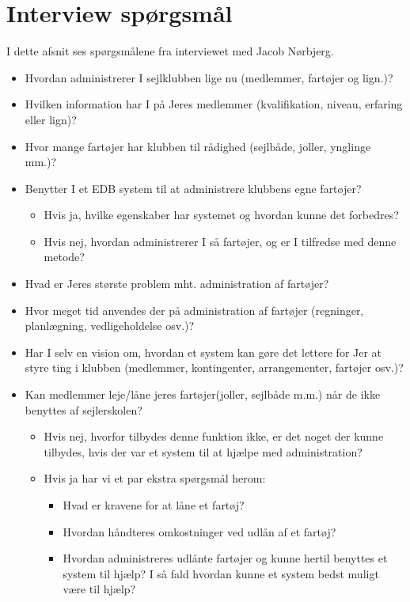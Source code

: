 \chapter{Interview spørgsmål} \label{questions}
I dette afsnit ses spørgsmålene fra interviewet med Jacob Nørbjerg.

\begin{itemize}
\item Hvordan administrerer I sejlklubben lige nu (medlemmer, fartøjer og lign.)?
\item Hvilken information har I på Jeres medlemmer (kvalifikation, niveau, erfaring eller lign)?
\item Hvor mange fartøjer har klubben til rådighed (sejlbåde, joller, ynglinge mm.)?
\item Benytter I et EDB system til at administrere klubbens egne fartøjer?
	\begin{itemize}
	\item Hvis ja, hvilke egenskaber har systemet og hvordan kunne det forbedres?
	\item Hvis nej, hvordan administrerer I så fartøjer, og er I tilfredse med denne metode?
	\end{itemize}
\item Hvad er Jeres største problem mht. administration af fartøjer?
\item Hvor meget tid anvendes der på administration af fartøjer (regninger, planlægning, vedligeholdelse osv.)?
\item Har I selv en vision om, hvordan et system kan gøre det lettere for Jer at styre ting i klubben (medlemmer, kontingenter, arrangementer, fartøjer osv.)?
\item Kan medlemmer leje/låne jeres fartøjer(joller, sejlbåde m.m.) når de ikke benyttes af sejlerskolen?
	\begin{itemize}
	\item Hvis nej, hvorfor tilbydes denne funktion ikke, er det noget der kunne tilbydes, hvis der var et system til at hjælpe med administration?
	\item Hvis ja har vi et par ekstra spørgsmål herom:
		\begin{itemize}
		\item Hvad er kravene for at låne et fartøj?
		\item Hvordan håndteres omkostninger ved udlån af et fartøj?
		\item Hvordan administreres udlånte fartøjer og kunne hertil benyttes et system til hjælp? I så fald hvordan kunne et system bedst muligt være til hjælp?
		\end{itemize}
	\end{itemize}
\end{itemize}
